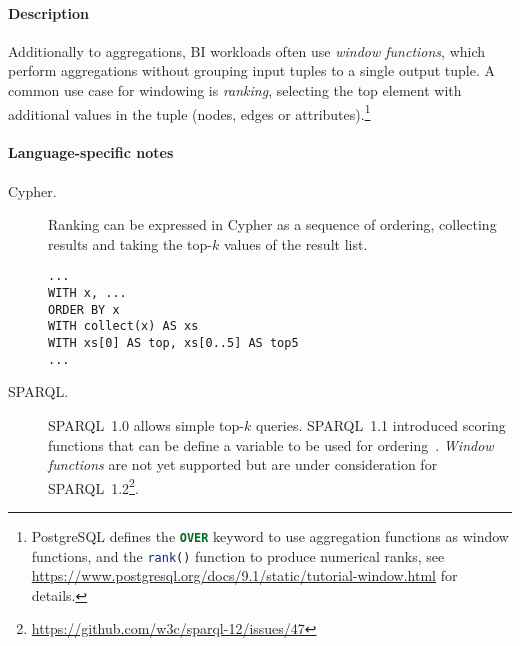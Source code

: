 



\paragraph{Description}

Additionally to aggregations, BI workloads often use \emph{window functions},
which perform aggregations without grouping input tuples to a single output
tuple.  A common use case for windowing is \emph{ranking}, \ie selecting the top
element with additional values in the tuple (nodes, edges or
attributes).\footnote{PostgreSQL defines the \lstinline[language=sql]{OVER}
keyword to use aggregation functions as window functions, and the
\lstinline[language=sql]{rank()} function to produce numerical ranks, see
\url{https://www.postgresql.org/docs/9.1/static/tutorial-window.html} for
details.}

\paragraph{Language-specific notes}

\begin{description}
\item[Cypher.]
Ranking can be expressed in Cypher as a sequence of ordering, collecting results and taking the top-$k$ values of the result list.\\

\noindent\begin{minipage}{\linewidth}
\begin{lstlisting}[language=cypher]
...
WITH x, ...
ORDER BY x
WITH collect(x) AS xs
WITH xs[0] AS top, xs[0..5] AS top5
...
\end{lstlisting}
\end{minipage}

\item[SPARQL.] SPARQL~1.0 allows simple top-$k$ queries. SPARQL~1.1 introduced scoring functions that can be define a variable to be used for ordering~\cite{DBLP:conf/semweb/MagliacaneBV12}.
\emph{Window functions} are not yet supported but are under consideration for SPARQL~1.2\footnote{\url{https://github.com/w3c/sparql-12/issues/47}}.

\end{description}

